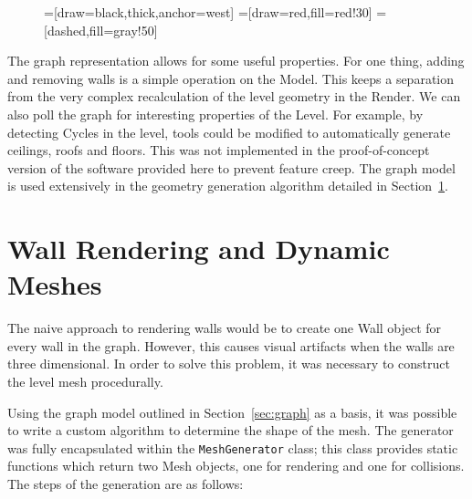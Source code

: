 \begin{figure}
=[draw=black,thick,anchor=west]
=[draw=red,fill=red!30]
=[dashed,fill=gray!50]
\end{figure}

The graph representation allows for some useful properties. For one thing, adding and removing walls is a simple operation on the Model. This keeps a separation from the very complex recalculation of the level geometry in the Render. We can also poll the graph for interesting properties of the Level. For example, by detecting Cycles in the level, tools could be modified to automatically generate ceilings, roofs and floors. This was not implemented in the proof-of-concept version of the software provided here to prevent feature creep. The graph model is used extensively in the geometry generation algorithm detailed in Section~\ref{sec:mesh}.

\section{Wall Rendering and Dynamic Meshes}
\label{sec:mesh}

The naive approach to rendering walls would be to create one Wall object for every wall in the graph. However, this causes visual artifacts when the walls are three dimensional. In order to solve this problem, it was necessary to construct the level mesh procedurally.

Using the graph model outlined in Section~\ref{sec:graph} as a basis, it was possible to write a custom algorithm to determine the shape of the mesh. The generator was fully encapsulated within the \verb|MeshGenerator| class; this class provides static functions which return two Mesh objects, one for rendering and one for collisions. The steps of the generation are as follows:

